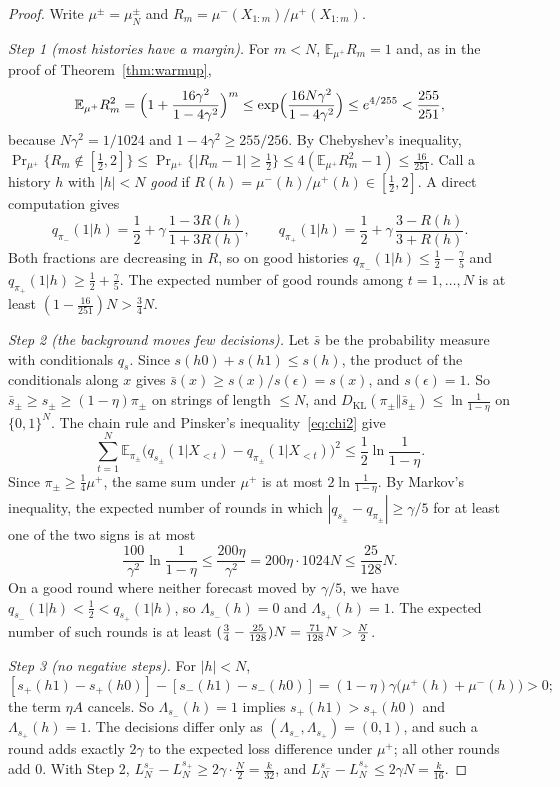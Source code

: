 \documentclass[11pt]{article}
\newcommand{\B}{\{0,1\}}
\newcommand{\eps}{\epsilon}
\newcommand{\E}{\mathbb{E}}
\newcommand{\KL}{D_{\mathrm{KL}}}
\theoremstyle{definition}
\theoremstyle{remark}
\begin{document}
\begin{proof}
Write $\mu^\pm=\mu^\pm_N$ and $R_m=\mu^-(X_{1:m})/\mu^+(X_{1:m})$.

\emph{Step 1 (most histories have a margin).} For $m<N$, $\E_{\mu^+} R_m=1$ and,
as in the proof of Theorem~\ref{thm:warmup},
\[
\E_{\mu^+} R_m^2=\Bigl(1+\frac{16\gamma^2}{1-4\gamma^2}\Bigr)^m
\le\exp\Bigl(\frac{16N\gamma^2}{1-4\gamma^2}\Bigr)\le e^{4/255}<\frac{255}{251},
\]
because $N\gamma^2=1/1024$ and $1-4\gamma^2\ge255/256$. By Chebyshev's
inequality,
$\Pr_{\mu^+}\{R_m\notin[\frac12,2]\}\le\Pr_{\mu^+}\{|R_m-1|\ge\frac12\}\le4(\E_{\mu^+} R_m^2-1)\le\frac{16}{251}$.
Call a history $h$ with $|h|<N$ \emph{good} if $R(h)=\mu^-(h)/\mu^+(h)\in[\frac12,2]$.
A direct computation gives
\[
q_{\pi_-}(1|h)=\frac12+\gamma\,\frac{1-3R(h)}{1+3R(h)},\qquad
q_{\pi_+}(1|h)=\frac12+\gamma\,\frac{3-R(h)}{3+R(h)} .
\]
Both fractions are decreasing in $R$, so on good histories
$q_{\pi_-}(1|h)\le\frac12-\frac\gamma5$ and $q_{\pi_+}(1|h)\ge\frac12+\frac\gamma5$.
The expected number of good rounds among $t=1,\dots,N$ is at least
$(1-\frac{16}{251})N>\frac34N$.

\emph{Step 2 (the background moves few decisions).}
Let $\bar s$ be the probability measure with conditionals $q_s$. Since
$s(h0)+s(h1)\le s(h)$, the product of the conditionals along $x$ gives
$\bar s(x)\ge s(x)/s(\eps)=s(x)$, and $s(\eps)=1$. So
$\bar s_\pm\ge s_\pm\ge(1-\eta)\pi_\pm$ on strings of length $\le N$, and
$\KL(\pi_\pm\Vert\bar s_\pm)\le\ln\frac1{1-\eta}$ on $\B^N$. The chain rule
and Pinsker's inequality~\eqref{eq:chi2} give
\[
\sum_{t=1}^N\E_{\pi_\pm}\bigl(q_{s_\pm}(1|X_{<t})-q_{\pi_\pm}(1|X_{<t})\bigr)^2
\le\frac12\ln\frac1{1-\eta}.
\]
Since $\pi_\pm\ge\frac14\mu^+$, the same sum under $\mu^+$ is at most
$2\ln\frac1{1-\eta}$. By Markov's inequality, the expected number of rounds in
which $|q_{s_\pm}-q_{\pi_\pm}|\ge\gamma/5$ for at least one of the two signs is
at most
\[
\frac{100}{\gamma^2}\ln\frac1{1-\eta}\le\frac{200\eta}{\gamma^2}
=200\eta\cdot1024N\le\frac{25}{128}N .
\]
On a good round where neither forecast moved by $\gamma/5$, we have
$q_{s_-}(1|h)<\frac12<q_{s_+}(1|h)$, so $\Lambda_{s_-}(h)=0$ and
$\Lambda_{s_+}(h)=1$. The expected number of such rounds is at least
$(\frac34-\frac{25}{128})N=\frac{71}{128}N>\nobreak\frac N2$.

\emph{Step 3 (no negative steps).} For $|h|<N$,
\[
[s_+(h1)-s_+(h0)]-[s_-(h1)-s_-(h0)]=(1-\eta)\gamma\bigl(\mu^+(h)+\mu^-(h)\bigr)>0;
\]
the term $\eta A$ cancels. So $\Lambda_{s_-}(h)=1$ implies
$s_+(h1)>s_+(h0)$ and $\Lambda_{s_+}(h)=1$. The decisions differ only as
$(\Lambda_{s_-},\Lambda_{s_+})=(0,1)$, and such a round adds exactly $2\gamma$
to the expected loss difference under $\mu^+$; all other rounds add $0$. With
Step 2, $L_N^{s_-}-L_N^{s_+}\ge2\gamma\cdot\frac N2=\frac{k}{32}$, and
$L_N^{s_-}-L_N^{s_+}\le2\gamma N=\frac k{16}$.
\end{proof}
\end{document}
